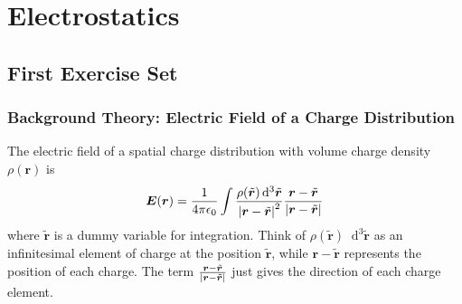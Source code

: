 \documentclass[11pt, a4paper]{article}
\newcommand{\diff}{\mathop{}\!\mathrm{d}} %
\renewcommand{\vec}[1]{\bm{#1}} %
\newcommand{\tvec}[1]{\tilde{\vec{#1}}} %
\renewcommand{\r}{\vec{r}}
\newcommand{\ee}{\epsilon_{0}}  %
\begin{document}
\tableofcontents

\newpage

\section{Electrostatics}

\subsection{First Exercise Set}

\subsubsection{Background Theory: Electric Field of a Charge Distribution}
The electric field of a spatial charge distribution with volume charge density $ \rho(\r) $ is
\begin{equation*}
	\vec{E}(\vec{r}) = \frac{1}{4\pi \ee}\int \frac{\rho(\tvec{r}) \diff^{3}\tvec{r} }{\abs{\vec{r} - \tvec{r}}^{2}} \frac{\vec{r} - \tvec{r}}{\abs{\vec{r} - \tvec{r}}}
\end{equation*}
where $ \tvec{r} $ is a dummy variable for integration. Think of $ \rho(\tvec{r}) \diff^{3}\tvec{r} $ as an infinitesimal element of charge at the position $ \tvec{r} $, while $ \vec{r} - \tvec{r} $ represents the position of each charge. The term $ \frac{\vec{r} - \tvec{r}}{\abs{\vec{r} - \tvec{r}}} $ just gives the direction of each charge element.
\end{document}
